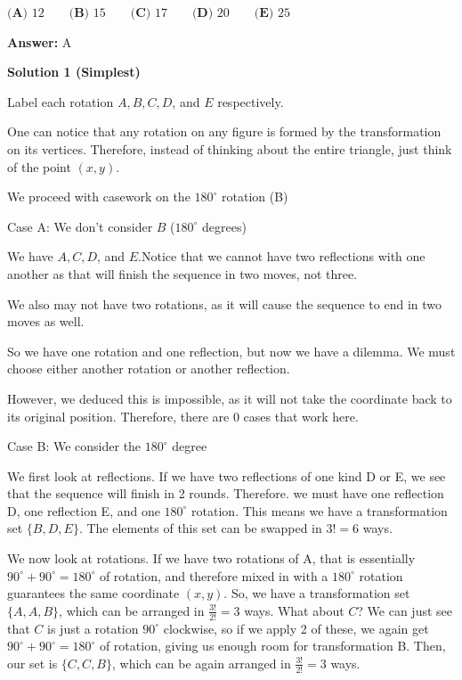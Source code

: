 \begin{enumerate}
 $\textbf{(A) } 12 \qquad \textbf{(B) } 15 \qquad \textbf{(C) } 17 \qquad \textbf{(D) } 20 \qquad \textbf{(E) } 25$

 \textbf{Answer: }A



\textbf{Solution 1 (Simplest)}

Label each rotation \( A, B, C, D \), and \( E \) respectively.

 One can notice that any rotation on any figure is formed by the transformation on its vertices. Therefore, instead of thinking about the entire triangle, just think of the point \( (x, y) \).

 We proceed with casework on the \( 180^\circ \) rotation (B)

 Case A: We don't consider \( B \) (\( 180^\circ \) degrees)

 We have \( A, C, D \), and \( E \).Notice that we cannot have two reflections with one another as that will finish the sequence in two moves, not three.

 We also may not have two rotations, as it will cause the sequence to end in two moves as well.

 So we have one rotation and one reflection, but now we have a dilemma. We must choose either another rotation or another reflection.

 However, we deduced this is impossible, as it will not take the coordinate back to its original position. Therefore, there are 0 cases that work here.

 Case B: We consider the \( 180^\circ \) degree

 We first look at reflections. If we have two reflections of one kind D or E, we see that the sequence will finish in 2 rounds. Therefore. we must have one reflection D, one reflection E, and one \( 180^\circ \) rotation. This means we have a transformation set \( \{B, D, E\} \). The elements of this set can be swapped in \( 3! = 6 \) ways.

 We now look at rotations. If we have two rotations of A, that is essentially \( 90^\circ + 90^\circ = 180^\circ \) of rotation, and therefore mixed in with a \( 180^\circ \) rotation guarantees the same coordinate \( (x, y) \). So, we have a transformation set \( \{A, A, B\} \), which can be arranged in \( \frac{3!}{2!} = 3 \) ways. What about \( C \)? We can just see that \( C \) is just a rotation \( 90^\circ \) clockwise, so if we apply 2 of these, we again get \( 90^\circ + 90^\circ = 180^\circ \) of rotation, giving us enough room for transformation B. Then, our set is \( \{C, C, B\} \), which can be again arranged in \( \frac{3!}{2!} = 3 \) ways.


\end{enumerate}
